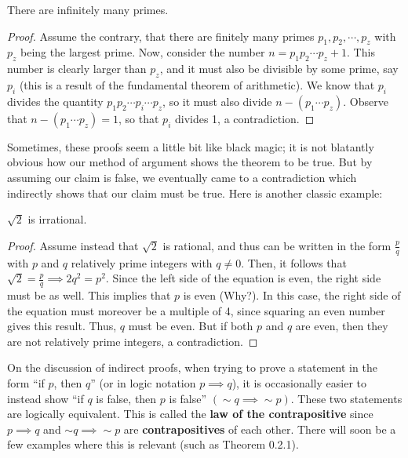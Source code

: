 \begin{theorem}
    There are infinitely many primes.
\end{theorem}
\vspace{-3.5mm}
\begin{proof}
    Assume the contrary, that there are finitely many primes $p_1, p_2, \cdots, p_z$ with $p_z$ being the largest prime. Now, consider the number $n=p_1p_2\cdots p_z +1$. This number is clearly larger than $p_z$, and it must also be divisible by some prime, say $p_i$ (this is a result of the fundamental theorem of arithmetic). We know that $p_i$ divides the quantity $p_1p_2\cdots p_i\cdots p_z$, so it must also divide $n-(p_1\cdots p_z)$. Observe that $n-(p_1\cdots p_z)=1$, so that $p_i$ divides 1, a contradiction.  
\end{proof}

Sometimes, these proofs seem a little bit like black magic; it is not blatantly obvious how our method of argument shows the theorem to be true. But by assuming our claim is false, we eventually came to a contradiction which indirectly shows that our claim must be true. Here is another classic example:

\begin{theorem}
    $\sqrt{2}$ is irrational.
\end{theorem}
\vspace{-3.5mm}

\begin{proof}
    Assume instead that $\sqrt{2}$ is rational, and thus can be written in the form $\frac{p}{q}$ with $p$ and $q$ relatively prime integers with $q\neq 0$. Then, it follows that $\sqrt{2}=\frac{p}{q}\implies 2q^2=p^2$. Since the left side of the equation is even, the right side must be as well. This implies that $p$ is even (Why?). In this case, the right side of the equation must moreover be a multiple of 4, since squaring an even number gives this result. Thus, $q$ must be even. But if both $p$ and $q$ are even, then they are not relatively prime integers, a contradiction. 
\end{proof}

On the discussion of indirect proofs, when trying to prove a statement in the form ``if $p$, then $q$'' (or in logic notation $p\implies q$), it is occasionally easier to instead show ``if $q$ is false, then $p$ is false'' $(\sim q\implies \sim p)$. These two statements are logically equivalent. This is called the \textbf{law of the contrapositive} since $p\implies q$ and $\sim q \implies \sim p$ are \textbf{contrapositives} of each other. There will soon be a few examples where this is relevant (such as Theorem 0.2.1). \\

